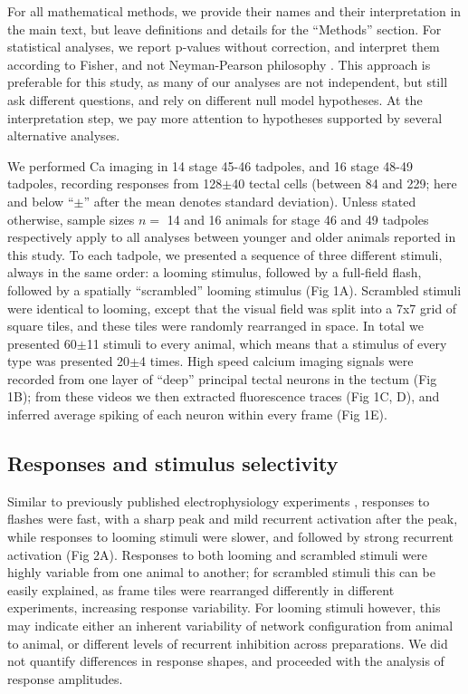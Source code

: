\documentclass{article}
\begin{document}
For all mathematical methods, we provide their names and their interpretation in the main text, but leave definitions and details for the “Methods” section. For statistical analyses, we report p-values without correction, and interpret them according to Fisher, and not Neyman-Pearson philosophy \citep{greenland2016}. This approach is preferable for this study, as many of our analyses are not independent, but still ask different questions, and rely on different null model hypotheses. At the interpretation step, we pay more attention to hypotheses supported by several alternative analyses.

We performed Ca imaging in 14 stage 45-46 tadpoles, and 16 stage 48-49 tadpoles, recording responses from 128$\pm$40 tectal cells (between 84 and 229; here and below “$\pm$” after the mean denotes standard deviation). Unless stated otherwise, sample sizes $n=$ 14 and 16 animals for stage 46 and 49 tadpoles respectively apply to all analyses between younger and older animals reported in this study. To each tadpole, we presented a sequence of three different stimuli, always in the same order: a looming stimulus, followed by a full-field flash, followed by a spatially “scrambled” looming stimulus (Fig 1A). Scrambled stimuli were identical to looming, except that the visual field was split into a 7x7 grid of square tiles, and these tiles were randomly rearranged in space. In total we presented 60$\pm$11 stimuli to every animal, which means that a stimulus of every type was presented 20$\pm$4 times. High speed calcium imaging signals \citep{xu2011,truszkowski2017} were recorded from one layer of “deep” principal tectal neurons in the tectum (Fig 1B); from these videos we then extracted fluorescence traces (Fig 1C, D), and inferred average spiking of each neuron within every frame (Fig 1E).

\subsection*{Responses and stimulus selectivity}

Similar to previously published electrophysiology experiments \citep{khakhalin2014}, responses to flashes were fast, with a sharp peak and mild recurrent activation after the peak, while responses to looming stimuli were slower, and followed by strong recurrent activation (Fig 2A). Responses to both looming and scrambled stimuli were highly variable from one animal to another; for scrambled stimuli this can be easily explained, as frame tiles were rearranged differently in different experiments, increasing response variability. For looming stimuli however, this may indicate either an inherent variability of network configuration from animal to animal, or different levels of recurrent inhibition across preparations. We did not quantify differences in response shapes, and proceeded with the analysis of response amplitudes.
\end{document}
